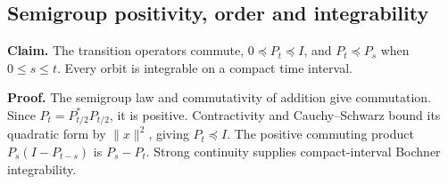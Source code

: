\documentclass[11pt,a4paper]{report}
\begin{document}
\subsection{\texorpdfstring{Semigroup positivity, order and integrability}{Semigroup positivity, order and integrability}}
\label{report-step-WassersteinMixing-SemigroupPoisson-lean-1}


\textbf{Claim.} The transition operators commute, \(0\preceq P_t\preceq I\), and \(P_t\preceq P_s\) when \(0\le s\le t\). Every orbit is integrable on a compact time interval.



\textbf{Proof.} The semigroup law and commutativity of addition give commutation. Since \(P_t=P_{t/2}^*P_{t/2}\), it is positive. Contractivity and Cauchy–Schwarz bound its quadratic form by \(\|x\|^2\), giving \(P_t\preceq I\). The positive commuting product \(P_s(I-P_{t-s})\) is \(P_s-P_t\). Strong continuity supplies compact-interval Bochner integrability.
\end{document}
